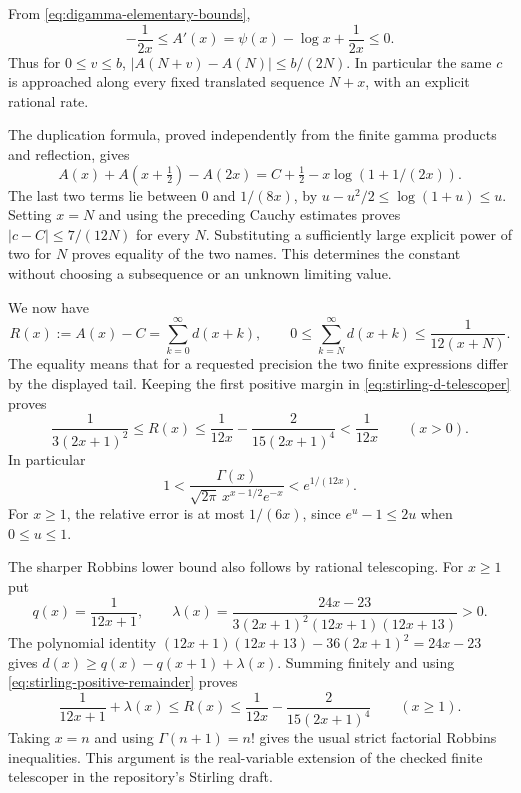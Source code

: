 From \eqref{eq:digamma-elementary-bounds},
\[
 -\frac1{2x}\le A'(x)=\psi(x)-\log x+\frac1{2x}\le0.
\]
Thus for $0\le v\le b$, $|A(N+v)-A(N)|\le b/(2N)$.  In particular the
same $c$ is approached along every fixed translated sequence $N+x$,
with an explicit rational rate.

The duplication formula, proved independently from the finite gamma
products and reflection, gives
\begin{equation}\label{eq:constant-by-duplication}
 A(x)+A(x+\tfrac12)-A(2x)
 =C+\tfrac12-x\log(1+1/(2x)).
\end{equation}
The last two terms lie between $0$ and $1/(8x)$, by
$u-u^2/2\le\log(1+u)\le u$.  Setting $x=N$ and using the preceding
Cauchy estimates proves $|c-C|\le7/(12N)$ for every $N$.  Substituting a
sufficiently large explicit power of two for $N$ proves equality of the
two names.  This determines the constant without choosing a subsequence
or an unknown limiting value.

We now have
\begin{equation}\label{eq:stirling-positive-remainder}
 R(x):=A(x)-C=\sum_{k=0}^{\infty}d(x+k),\qquad
 0\le\sum_{k=N}^{\infty}d(x+k)\le\frac1{12(x+N)}.
\end{equation}
The equality means that for a requested precision the two finite
expressions differ by the displayed tail.  Keeping the first positive
margin in \eqref{eq:stirling-d-telescoper} proves
\begin{equation}\label{eq:stirling-first-bound}
 \frac1{3(2x+1)^2}\le R(x)
 \le\frac1{12x}-\frac2{15(2x+1)^4}<\frac1{12x}
 \qquad(x>0).
\end{equation}
In particular
\begin{equation}\label{eq:stirling-multiplicative-bound}
 1<\frac{\Gamma(x)}{\sqrt{2\pi}\,x^{x-1/2}e^{-x}}<e^{1/(12x)}.
\end{equation}
For $x\ge1$, the relative error is at most $1/(6x)$, since
$e^u-1\le2u$ when $0\le u\le1$.

The sharper Robbins lower bound also follows by rational telescoping.
For $x\ge1$ put
\[
 q(x)=\frac1{12x+1},\qquad
 \lambda(x)=\frac{24x-23}
 {3(2x+1)^2(12x+1)(12x+13)}>0.
\]
The polynomial identity
$(12x+1)(12x+13)-36(2x+1)^2=24x-23$ gives
$d(x)\ge q(x)-q(x+1)+\lambda(x)$.  Summing finitely and using
\eqref{eq:stirling-positive-remainder} proves
\begin{equation}\label{eq:robbins-real}
 \frac1{12x+1}+\lambda(x)\le R(x)
 \le\frac1{12x}-\frac2{15(2x+1)^4}\qquad(x\ge1).
\end{equation}
Taking $x=n$ and using $\Gamma(n+1)=n!$ gives the usual strict factorial
Robbins inequalities.  This argument is the real-variable extension of
the checked finite telescoper in the repository's Stirling draft.

